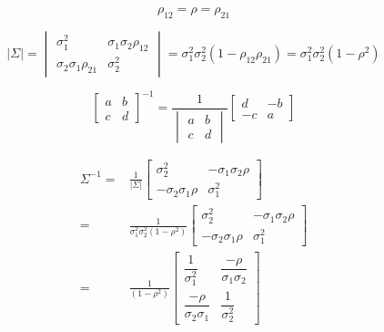 \documentclass[
]{book}
\theoremstyle{definition}
\theoremstyle{definition}
\theoremstyle{definition}
\theoremstyle{definition}
\theoremstyle{remark}
\begin{document}
\[
\rho_{12}=\rho=\rho_{21}
\]

\[
\left|\mathit{\Sigma}\right|=\begin{vmatrix}\sigma_{1}^{2} & \sigma_{1}\sigma_{2}\rho_{12}\\
\sigma_{2}\sigma_{1}\rho_{21} & \sigma_{2}^{2}
\end{vmatrix}=\sigma_{1}^{2}\sigma_{2}^{2}\left(1-\rho_{12}\rho_{21}\right)=\sigma_{1}^{2}\sigma_{2}^{2}\left(1-\rho^{2}\right)
\]

\[
\left[\begin{array}{ll}
a & b\\
c & d
\end{array}\right]^{-1}=\frac{1}{\begin{vmatrix}a & b\\
c & d
\end{vmatrix}}\left[\begin{array}{cc}
d & -b\\
-c & a
\end{array}\right]
\]

\[
\begin{aligned}
\mathit{\Sigma}^{-1}= & \frac{1}{\left|\mathit{\Sigma}\right|}\left[\begin{array}{cc}
\sigma_{2}^{2} & -\sigma_{1}\sigma_{2}\rho\\
-\sigma_{2}\sigma_{1}\rho & \sigma_{1}^{2}
\end{array}\right]\\
= & \frac{1}{\sigma_{1}^{2}\sigma_{2}^{2}\left(1-\rho^{2}\right)}\left[\begin{array}{cc}
\sigma_{2}^{2} & -\sigma_{1}\sigma_{2}\rho\\
-\sigma_{2}\sigma_{1}\rho & \sigma_{1}^{2}
\end{array}\right]\\
= & \frac{1}{\left(1-\rho^{2}\right)}\left[\begin{array}{cc}
\dfrac{1}{\sigma_{1}^{2}} & \dfrac{-\rho}{\sigma_{1}\sigma_{2}}\\
\dfrac{-\rho}{\sigma_{2}\sigma_{1}} & \dfrac{1}{\sigma_{2}^{2}}
\end{array}\right]
\end{aligned}
\]
\end{document}
